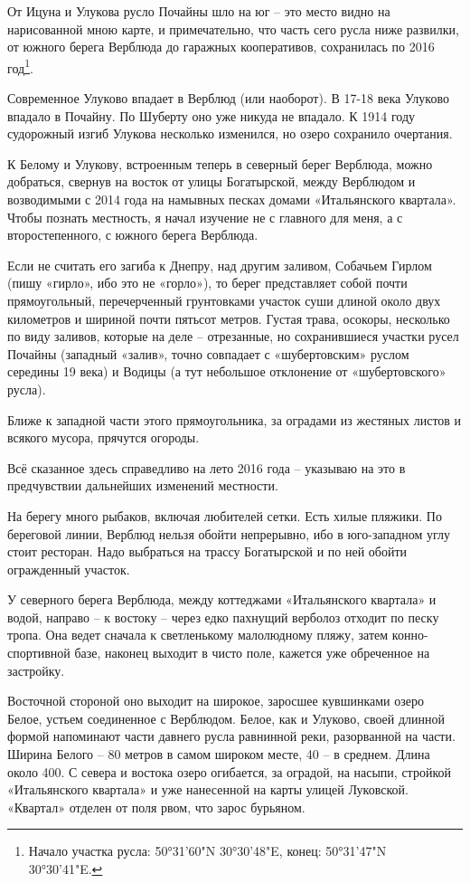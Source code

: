 От Ицуна и Улукова русло Почайны шло на юг – это место видно на нарисованной мною карте, и примечательно, что часть сего русла ниже развилки, от южного берега Верблюда до гаражных кооперативов, сохранилась по 2016 год\footnote{Начало участка русла: 50°31'60"N  30°30'48"E, конец: 50°31'47"N 30°30'41"E.}. 

Современное Улуково впадает в Верблюд (или наоборот). В 17-18 века Улуково впадало в Почайну. По Шуберту оно уже никуда не впадало. К 1914 году судорожный изгиб Улукова несколько изменился, но озеро сохранило очертания.

К Белому и Улукову, встроенным теперь в северный берег Верблюда, можно добраться, свернув на восток от улицы Богатырской, между Верблюдом и возводимыми с 2014 года на намывных песках домами «Итальянского квартала». Чтобы познать местность, я начал изучение не с главного для меня, а с второстепенного, с южного берега Верблюда.

Если не считать его загиба к Днепру, над другим заливом, Собачьем Гирлом (пишу «гирло», ибо это не «горло»), то берег представляет собой почти прямоугольный, перечерченный грунтовками участок суши длиной около двух километров и шириной почти пятьсот метров. Густая трава, осокоры, несколько по виду заливов, которые на деле – отрезанные, но сохранившиеся участки русел Почайны (западный «залив», точно совпадает с «шубертовским» руслом середины 19 века) и Водицы (а тут небольшое отклонение от «шубертовского» русла).

Ближе к западной части  этого прямоугольника, за оградами из жестяных листов и всякого мусора, прячутся огороды.

Всё сказанное здесь справедливо на лето 2016 года – указываю на это в предчувствии дальнейших изменений местности.

На берегу много рыбаков, включая любителей сетки. Есть хилые пляжики. По береговой линии, Верблюд нельзя обойти непрерывно, ибо в юго-западном углу стоит ресторан. Надо выбраться на трассу Богатырской и по ней обойти огражденный участок.

У северного берега Верблюда, между коттеджами «Итальянского квартала» и водой, направо – к востоку – через едко пахнущий верболоз отходит по песку тропа. Она ведет сначала к светленькому малолюдному пляжу, затем конно-спортивной базе, наконец выходит в чисто поле, кажется уже обреченное на застройку.

Восточной стороной оно выходит на широкое, заросшее кувшинками озеро Белое, устьем соединенное с Верблюдом. Белое, как и Улуково, своей длинной формой напоминают части давнего русла равнинной реки, разорванной на части. Ширина Белого – 80 метров в самом широком месте, 40 – в среднем. Длина около 400. С севера и востока озеро огибается, за оградой, на насыпи, стройкой «Итальянского квартала» и уже нанесенной на карты улицей Луковской. «Квартал» отделен от поля рвом, что зарос бурьяном.

